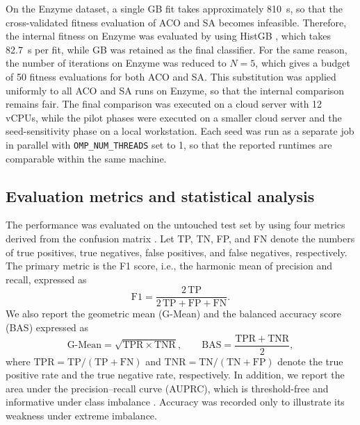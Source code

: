 \documentclass[pdflatex,sn-basic]{sn-jnl}
\begin{document}
On the Enzyme dataset, a single GB fit takes approximately 810~s, so
that the cross-validated fitness evaluation of ACO and SA becomes
infeasible. Therefore, the internal fitness on Enzyme was evaluated by
using HistGB \citep{ke2017lightgbm}, which takes 82.7~s per fit, while GB was retained as the final classifier. For the same reason, the number of iterations on Enzyme was reduced to $N = 5$, which gives a budget of 50 fitness evaluations for both ACO and SA. This substitution was applied
uniformly to all ACO and SA runs on Enzyme, so that the internal
comparison remains fair. The final comparison was executed on a cloud server with 12 vCPUs, while the pilot phases were executed on a smaller cloud server and the seed-sensitivity phase on a local workstation. Each seed was run as a separate job in parallel with
\texttt{OMP\_NUM\_THREADS} set to 1, so that the reported runtimes are
comparable within the same machine.

\subsection{Evaluation metrics and statistical analysis}
The performance was evaluated on the untouched test set by using four
metrics derived from the confusion matrix \citep{cahyana2019improving}.
Let TP, TN, FP, and FN denote the numbers of true positives, true
negatives, false positives, and false negatives, respectively. The
primary metric is the F1 score, i.e., the harmonic mean of precision and
recall, expressed as
\begin{equation}
  \mathrm{F1} = \frac{2\,\mathrm{TP}}
  {2\,\mathrm{TP} + \mathrm{FP} + \mathrm{FN}}.
  \label{eq:f1}
\end{equation}
We also report the geometric mean (G-Mean) and the balanced accuracy
score (BAS) expressed as
\begin{equation}
  \text{G-Mean} = \sqrt{\mathrm{TPR} \times \mathrm{TNR}},
  \qquad
  \mathrm{BAS} = \frac{\mathrm{TPR} + \mathrm{TNR}}{2},
  \label{eq:gmean_bas}
\end{equation}
where $\mathrm{TPR} = \mathrm{TP}/(\mathrm{TP}+\mathrm{FN})$ and
$\mathrm{TNR} = \mathrm{TN}/(\mathrm{TN}+\mathrm{FP})$ denote the
true positive rate and the true negative rate, respectively. In
addition, we report the area under the precision--recall curve (AUPRC),
which is threshold-free and informative under class imbalance
\citep{saito2015precision}. Accuracy was recorded only to illustrate
its weakness under extreme imbalance.
\end{document}
